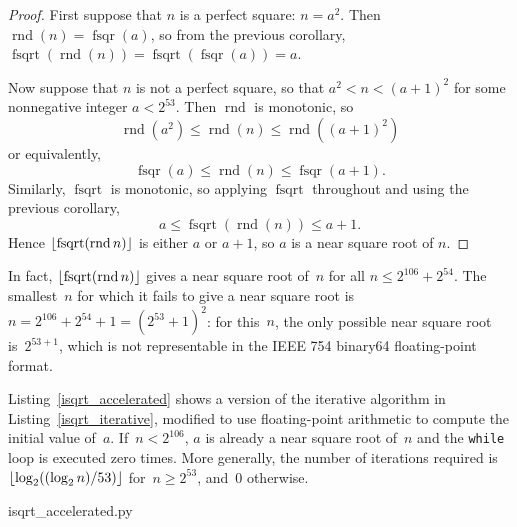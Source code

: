 \documentclass[a4paper]{article}
\DeclarePairedDelimiter\floor{\lfloor}{\rfloor}
\DeclareMathOperator{\rnd}{rnd}
\DeclareMathOperator{\fsqrt}{fsqrt}
\DeclareMathOperator{\fsqr}{fsqr}
\theoremstyle{plain}
\theoremstyle{definition}
\begin{document}
\begin{proof}
  First suppose that $n$ is a perfect square: $n = a^2$. Then $\rnd(n) =
  \fsqr(a)$, so from the previous corollary, $\fsqrt(\rnd(n)) =
  \fsqrt(\fsqr(a)) = a$.

  Now suppose that $n$ is not a perfect square, so that $a^2 < n < (a+1)^2$
  for some nonnegative integer $a < 2^{53}$. Then $\rnd$ is monotonic, so
    $$\rnd(a^2) \le \rnd(n) \le \rnd((a+1)^2)$$
  or equivalently,
    $$\fsqr(a) \le \rnd(n) \le \fsqr(a+1).$$
  Similarly, $\fsqrt$ is monotonic, so applying $\fsqrt$ throughout
  and using the previous corollary,
    $$a \le \fsqrt(\rnd(n)) \le a + 1.$$
  Hence $\floor{\fsqrt(\rnd n)}$ is either $a$ or $a+1$, so $a$ is a near
  square root of $n$.
\end{proof}

In fact, $\floor{\fsqrt(\rnd n)}$ gives a near square root of~$n$ for all $n
\le 2^{106} + 2^{54}$. The smallest~$n$ for which it fails to give a near
square root is $n = 2^{106} + 2^{54} + 1 = (2^{53} + 1)^2$: for this~$n$,
the only possible near square root is~$2^{53 + 1}$, which is not representable
in the IEEE 754 binary64 floating-point format.

Listing~\ref{isqrt_accelerated} shows a version of the iterative
algorithm in Listing~\ref{isqrt_iterative}, modified to use floating-point
arithmetic to compute the initial value of~$a$.  If~$n < 2^{106}$,
$a$ is already a near square root of~$n$ and the \lstinline$while$ loop is
executed zero times. More generally, the number of iterations required
is~$\floor{\log_2((\log_2n)/53)}$ for~$n \ge 2^{53}$, and~$0$ otherwise.


  {isqrt_accelerated.py}


\end{document}
